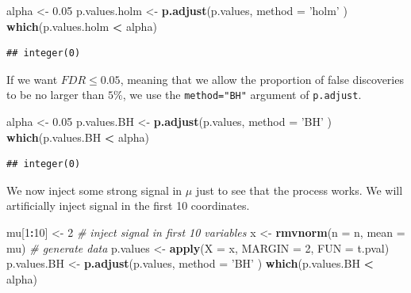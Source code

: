 \documentclass[]{book}
\newenvironment{Shaded}{\begin{snugshade}}{\end{snugshade}}
\newcommand{\KeywordTok}[1]{\textcolor[rgb]{0.13,0.29,0.53}{\textbf{#1}}}
\newcommand{\DataTypeTok}[1]{\textcolor[rgb]{0.13,0.29,0.53}{#1}}
\newcommand{\DecValTok}[1]{\textcolor[rgb]{0.00,0.00,0.81}{#1}}
\newcommand{\FloatTok}[1]{\textcolor[rgb]{0.00,0.00,0.81}{#1}}
\newcommand{\StringTok}[1]{\textcolor[rgb]{0.31,0.60,0.02}{#1}}
\newcommand{\CommentTok}[1]{\textcolor[rgb]{0.56,0.35,0.01}{\textit{#1}}}
\newcommand{\OperatorTok}[1]{\textcolor[rgb]{0.81,0.36,0.00}{\textbf{#1}}}
\newcommand{\NormalTok}[1]{#1}
\theoremstyle{definition}
\theoremstyle{definition}
\theoremstyle{definition}
\theoremstyle{remark}
\begin{document}
\begin{Shaded}
\begin{Highlighting}[]
\NormalTok{alpha <-}\StringTok{ }\FloatTok{0.05}
\NormalTok{p.values.holm <-}\StringTok{ }\KeywordTok{p.adjust}\NormalTok{(p.values, }\DataTypeTok{method =} \StringTok{'holm'}\NormalTok{ )}
\KeywordTok{which}\NormalTok{(p.values.holm }\OperatorTok{<}\StringTok{ }\NormalTok{alpha)}
\end{Highlighting}
\end{Shaded}

\begin{verbatim}
## integer(0)
\end{verbatim}

If we want \(FDR \leq 0.05\), meaning that we allow the proportion of
false discoveries to be no larger than \(5\%\), we use the
\texttt{method="BH"} argument of \texttt{p.adjust}.

\begin{Shaded}
\begin{Highlighting}[]
\NormalTok{alpha <-}\StringTok{ }\FloatTok{0.05}
\NormalTok{p.values.BH <-}\StringTok{ }\KeywordTok{p.adjust}\NormalTok{(p.values, }\DataTypeTok{method =} \StringTok{'BH'}\NormalTok{ )}
\KeywordTok{which}\NormalTok{(p.values.BH }\OperatorTok{<}\StringTok{ }\NormalTok{alpha)}
\end{Highlighting}
\end{Shaded}

\begin{verbatim}
## integer(0)
\end{verbatim}

We now inject some strong signal in \(\mu\) just to see that the process
works. We will artificially inject signal in the first 10 coordinates.

\begin{Shaded}
\begin{Highlighting}[]
\NormalTok{mu[}\DecValTok{1}\OperatorTok{:}\DecValTok{10}\NormalTok{] <-}\StringTok{ }\DecValTok{2} \CommentTok{# inject signal in first 10 variables}
\NormalTok{x <-}\StringTok{ }\KeywordTok{rmvnorm}\NormalTok{(}\DataTypeTok{n =}\NormalTok{ n, }\DataTypeTok{mean =}\NormalTok{ mu) }\CommentTok{# generate data}
\NormalTok{p.values <-}\StringTok{ }\KeywordTok{apply}\NormalTok{(}\DataTypeTok{X =}\NormalTok{ x, }\DataTypeTok{MARGIN =} \DecValTok{2}\NormalTok{, }\DataTypeTok{FUN =}\NormalTok{ t.pval) }
\NormalTok{p.values.BH <-}\StringTok{ }\KeywordTok{p.adjust}\NormalTok{(p.values, }\DataTypeTok{method =} \StringTok{'BH'}\NormalTok{ )}
\KeywordTok{which}\NormalTok{(p.values.BH }\OperatorTok{<}\StringTok{ }\NormalTok{alpha)}
\end{Highlighting}
\end{Shaded}
\end{document}
